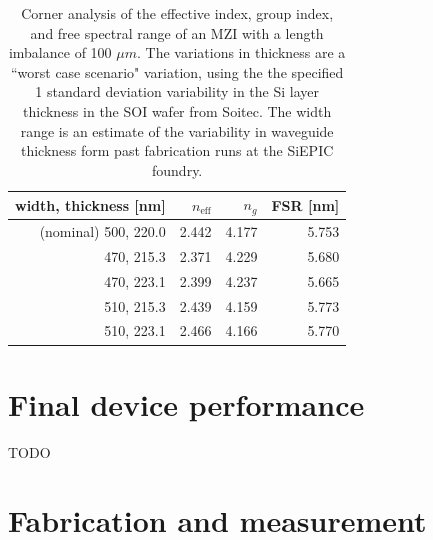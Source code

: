 \documentclass[journal]{IEEEtran}
\begin{document}
\begin{table}
\centering
\begin{tabular}{ r | r | r | r }
  \hline
  width, thickness [nm] & $n_{\text{eff}}$ & $n_g$ & FSR [nm] \\
  \hline
  (nominal) 500, 220.0  & 2.442            & 4.177 & 5.753  \\
  470, 215.3            & 2.371            & 4.229 & 5.680  \\
  470, 223.1            & 2.399            & 4.237 & 5.665  \\
  510, 215.3            & 2.439            & 4.159 & 5.773  \\
  510, 223.1            & 2.466            & 4.166 & 5.770  \\
\end{tabular}
\caption{Corner analysis of the effective index, group index, and free spectral range of an MZI with a length imbalance of 100 $\mu m$. The variations in thickness are a ``worst case scenario" variation, using the the specified 1 standard deviation variability in the Si layer thickness in the SOI wafer from Soitec. The width range is an estimate of the variability in waveguide thickness form past fabrication runs at the SiEPIC foundry.}
\label{tab:corner}
\end{table}

\section{Final device performance}

TODO

\section{Fabrication and measurement}
% 
\end{document}

